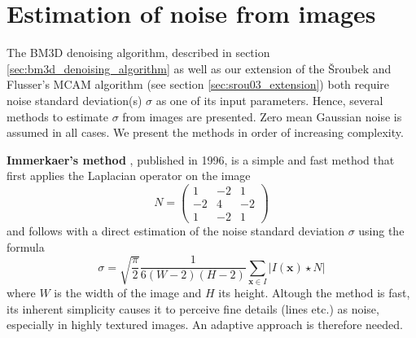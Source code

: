 \documentclass[12pt,notitlepage]{report}
\begin{document}
\section{Estimation of noise from images}
\label{sec:estimation_of_noise_from_images}

The BM3D denoising algorithm, described in section \ref{sec:bm3d_denoising_algorithm} as well as our extension of the Šroubek and Flusser's MCAM algorithm (see section \ref{sec:srou03_extension}) both require noise standard deviation(s) $\sigma$ as one of its input parameters. Hence, several methods to estimate $\sigma$ from images are presented. Zero mean Gaussian noise is assumed in all cases. We present the methods in order of increasing complexity. 

\noindent \textbf{Immerkaer's method} \cite{imm96}, published in 1996, is a simple and fast method that first applies the Laplacian operator on the image 
\begin{equation}
\label{eq:imm96_matrix}
	N = 
	\begin{pmatrix}
	 1&-2&1 \\
	-2&4&-2 \\
	 1&-2&1 
	\end{pmatrix} 
\end{equation}
and follows with a direct estimation of the noise standard deviation $\sigma$ using the formula
\begin{equation}
\label{eq:imm96_sigma}
	\sigma = \sqrt{\frac{\pi}{2}} \frac{1}{6(W-2)(H-2)}\sum_{\mathbf{x} \in I}^{}\left|I(\mathbf{x}) \star N \right|  
\end{equation}
where $W$ is the width of the image and $H$ its height. Altough the method is fast, its inherent simplicity causes it to perceive fine details (lines etc.) as noise, especially in highly textured images. An adaptive approach is therefore needed. 
\end{document}
